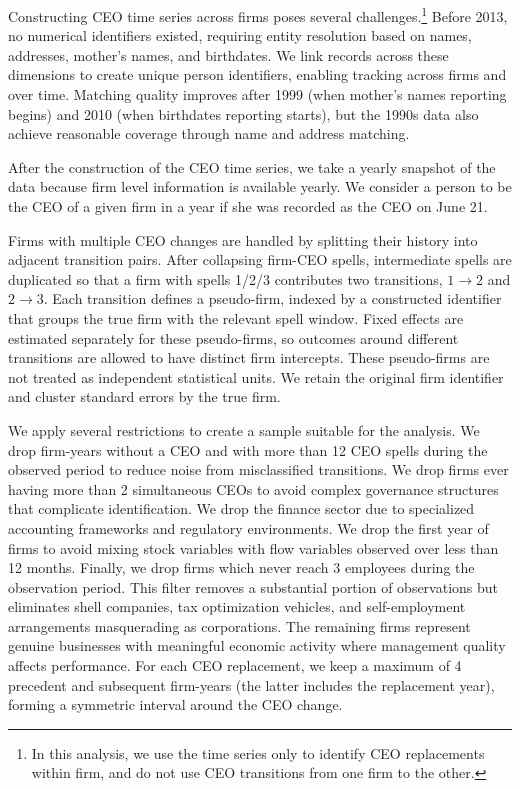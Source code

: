 \documentclass[11pt,a4paper]{article}
\begin{document}
Constructing CEO time series across firms poses several challenges.\footnote{In this analysis, we use the time series only to identify CEO replacements within firm, and do not use CEO transitions from one firm to the other.} Before 2013, no numerical identifiers existed, requiring entity resolution based on names, addresses, mother’s names, and birthdates. We link records across these dimensions to create unique person identifiers, enabling tracking across firms and over time. Matching quality improves after 1999 (when mother’s names reporting begins) and 2010 (when birthdates reporting starts), but the 1990s data also achieve reasonable coverage through name and address matching.

After the construction of the CEO time series, we take a yearly snapshot of the data because firm level information is available yearly. We consider a person to be the CEO of a given firm in a year if she was recorded as the CEO on June 21.

Firms with multiple CEO changes are handled by splitting their history into adjacent transition pairs. After collapsing firm-CEO spells, intermediate spells are duplicated so that a firm with spells 1/2/3 contributes two transitions, $1 \rightarrow 2$ and $2 \rightarrow 3$. Each transition defines a pseudo-firm, indexed by a constructed identifier that groups the true firm with the relevant spell window. Fixed effects are estimated separately for these pseudo-firms, so outcomes around different transitions are allowed to have distinct firm intercepts. These pseudo-firms are not treated as independent statistical units. We retain the original firm identifier and cluster standard errors by the true firm. 

We apply several restrictions to create a sample suitable for the analysis. We drop firm-years without a CEO and with more than 12 CEO spells during the observed period to reduce noise from misclassified transitions. We drop firms ever having more than 2 simultaneous CEOs to avoid complex governance structures that complicate identification. We drop the finance sector due to specialized accounting frameworks and regulatory environments. We drop the first year of firms to avoid mixing stock variables with flow variables observed over less than 12 months. Finally, we drop firms which never reach 3 employees during the observation period. This filter removes a substantial portion of observations but eliminates shell companies, tax optimization vehicles, and self-employment arrangements masquerading as corporations. The remaining firms represent genuine businesses with meaningful economic activity where management quality affects performance. For each CEO replacement, we keep a maximum of 4 precedent and subsequent firm-years (the latter includes the replacement year), forming a symmetric interval around the CEO change.
\end{document}
